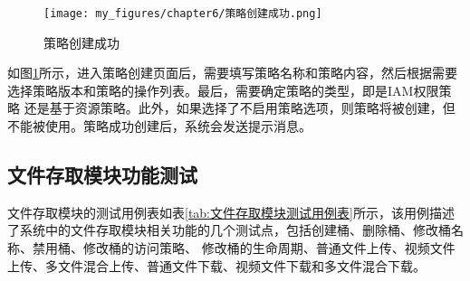 

\begin{figure}[htb]
    \centering
    \texttt{[image: my\_figures/chapter6/策略创建成功.png]}
    \caption{策略创建成功}
    \label{fig:策略创建成功}
\end{figure}

如图\ref{fig:策略创建成功}所示，进入策略创建页面后，需要填写策略名称和策略内容，然后根据需要选择策略版本和策略的操作列表。最后，需要确定策略的类型，即是IAM权限策略
还是基于资源策略。此外，如果选择了不启用策略选项，则策略将被创建，但不能被使用。策略成功创建后，系统会发送提示消息。




\subsection{文件存取模块功能测试}

文件存取模块的测试用例表如表\ref{tab:文件存取模块测试用例表}所示，该用例描述了系统中的文件存取模块相关功能的几个测试点，包括创建桶、删除桶、修改桶名称、禁用桶、修改桶的访问策略、
修改桶的生命周期、普通文件上传、视频文件上传、多文件混合上传、普通文件下载、视频文件下载和多文件混合下载。

